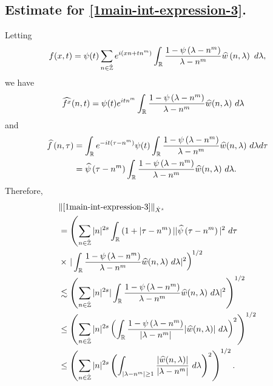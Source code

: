 \subsection{Estimate for \eqref{1main-int-expression-3}.}
Letting $$f(x,t) = \psi(t) \sum_{n \in \dot{\mathbb{Z}}} e^{i\left( xn + tn^m \right)} 
\int_{\mathbb{R}} \frac{1 - \psi\left( \lambda - n^m \right)}{\lambda - n^m} 
\widehat{w} \left( n, \lambda \right) \ d \lambda,$$ we have
%
%
\begin{equation*}
	\begin{split}
		& \widehat{f^x}(n, t) = \psi(t) e^{itn^m} \int_{\mathbb{R}}
		\frac{1 - \psi\left( \lambda - n^m \right)}{\lambda - n^m} 
		\widehat{w}(n, \lambda) \ d \lambda
	\end{split}
\end{equation*}
and
\begin{equation*}
	\begin{split}
		 \widehat{f}\left( n, \tau \right)
		 & = \int_{\mathbb{R}} e^{-it\left( \tau - n^m 
		\right)} \psi(t) \int_{\mathbb{R}} \frac{1 - \psi\left( 
		\lambda - n^m 
		\right)}{\lambda - n^m} \widehat{w}(n, \lambda) \ d \lambda d \tau
		\\
		& = \widehat{\psi}\left( \tau - n^m \right) \int_{\mathbb{R}} 
		\frac{1 - \psi\left( 
		\lambda - n^m 
		\right)}{\lambda - n^m} \widehat{w}(n, \lambda) \ d \lambda.
	\end{split}
\end{equation*}
Therefore,
%
%
\begin{equation*}
	\begin{split}
		& \| \eqref{1main-int-expression-3} \|_{\dot{X}^s} 
		\\
		& = \left( \sum_{n \in \dot{\mathbb{Z}}} |n|^{2s} \int_{\mathbb{R}} \left( 1 + | \tau - n^{m
		} \right ) | | \widehat{\psi}\left( \tau - n^m \right) |^2 \ d \tau
		\right.
		\\
		& \times \left . |
		\int_{\mathbb{R}} \frac{1 - \psi\left( \lambda - n^m \right)}{\lambda -
		n^m} \widehat{w}(n, \lambda) \ d \lambda |^2  \right)^{1/2}
		\\
		& \lesssim \left( \sum_{n \in \dot{\mathbb{Z}}} |n|^{2s} | \int_{\mathbb{R}}
		\frac{1 - \psi\left( \lambda - n^m \right)}{\lambda - n^m}
		\widehat{w}(n, \lambda) \ d\lambda |^2 \right)^{1/2}
		\\
		& \le \left( \sum_{n \in \dot{\mathbb{Z}}} |n|^{2s}  \left ( \int_{\mathbb{R}}
		\frac{1 - \psi\left( \lambda - n^m \right)}{|\lambda - n^m|}
		|\widehat{w}(n, \lambda) | \ d\lambda \right )^2 \right)^{1/2}
		\\
		& \le \left( \sum_{n \in \dot{\mathbb{Z}}} |n|^{2s}  \left ( \int_{| \lambda - 
		n^m | \ge 1}
		\frac{|\widehat{w}(n, \lambda) | }{|\lambda - n^m|}
		\ d\lambda \right )^2 \right)^{1/2}.
	\end{split}
\end{equation*}
